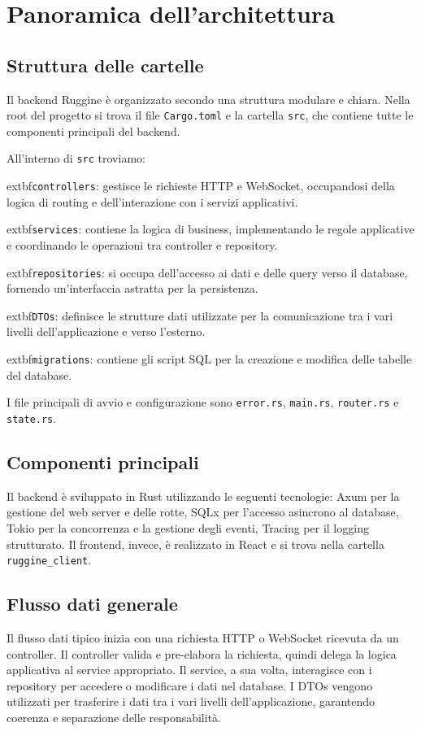 \chapter{Panoramica dell'architettura}

\section{Struttura delle cartelle}

Il backend Ruggine è organizzato secondo una struttura modulare e chiara. Nella root del progetto si trova il file \texttt{Cargo.toml} e la cartella \texttt{src}, che contiene tutte le componenti principali del backend.



All'interno di \texttt{src} troviamo:

	extbf{\texttt{controllers}}: gestisce le richieste HTTP e WebSocket, occupandosi della logica di routing e dell'interazione con i servizi applicativi.

	extbf{\texttt{services}}: contiene la logica di business, implementando le regole applicative e coordinando le operazioni tra controller e repository.

	extbf{\texttt{repositories}}: si occupa dell'accesso ai dati e delle query verso il database, fornendo un'interfaccia astratta per la persistenza.

	extbf{\texttt{DTOs}}: definisce le strutture dati utilizzate per la comunicazione tra i vari livelli dell'applicazione e verso l'esterno.

	extbf{\texttt{migrations}}: contiene gli script SQL per la creazione e modifica delle tabelle del database.

I file principali di avvio e configurazione sono \texttt{error.rs}, \texttt{main.rs}, \texttt{router.rs} e \texttt{state.rs}.

\section{Componenti principali}

Il backend è sviluppato in Rust utilizzando le seguenti tecnologie:
Axum per la gestione del web server e delle rotte, SQLx per l'accesso asincrono al database, Tokio per la concorrenza e la gestione degli eventi, Tracing per il logging strutturato. Il frontend, invece, è realizzato in React e si trova nella cartella \texttt{ruggine\_client}.

\section{Flusso dati generale}

Il flusso dati tipico inizia con una richiesta HTTP o WebSocket ricevuta da un controller. Il controller valida e pre-elabora la richiesta, quindi delega la logica applicativa al service appropriato. Il service, a sua volta, interagisce con i repository per accedere o modificare i dati nel database. I DTOs vengono utilizzati per trasferire i dati tra i vari livelli dell'applicazione, garantendo coerenza e separazione delle responsabilità.